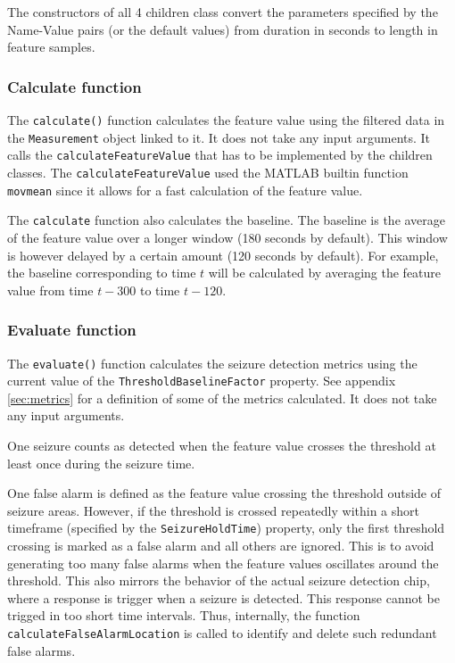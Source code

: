 \documentclass[usletter, 11pt]{extarticle}
\begin{document}
The constructors of all 4 children class convert the parameters specified by the Name-Value pairs (or the default values) from duration in seconds to length in feature samples.

\subsubsection{Calculate function}

The \verb|calculate()| function calculates the feature value using the filtered data in the \verb|Measurement| object linked to it. It does not take any input arguments. It calls the \verb|calculateFeatureValue| that has to be implemented by the children classes. The \verb|calculateFeatureValue| used the MATLAB builtin function \verb|movmean| since it allows for a fast calculation of the feature value.

The \verb|calculate| function also calculates the baseline. The baseline is the average of the feature value over a longer window (180 seconds by default). This window is however delayed by a certain amount (120 seconds by default). For example, the baseline corresponding to time $t$ will be calculated by averaging the feature value from time $t - 300$ to time $t - 120$.

\subsubsection{Evaluate function} \label{sec:feat_calc_eval}

The \verb|evaluate()| function calculates the seizure detection metrics using the current value of the \linebreak \verb|ThresholdBaselineFactor| property. See appendix \ref{sec:metrics} for a definition of some of the metrics calculated. It does not take any input arguments.

One seizure counts as detected when the feature value crosses the threshold at least once during the seizure time.

One false alarm is defined as the feature value crossing the threshold outside of seizure areas. However, if the threshold is crossed repeatedly within a short timeframe (specified by the \verb|SeizureHoldTime|) property, only the first threshold crossing is marked as a false alarm and all others are ignored. This is to avoid generating too many false alarms when the feature values oscillates around the threshold. This also mirrors the behavior of the actual seizure detection chip, where a response is trigger when a seizure is detected. This response cannot be trigged in too short time intervals. Thus, internally, the function \verb|calculateFalseAlarmLocation| is called to identify and delete such redundant false alarms.
\end{document}
